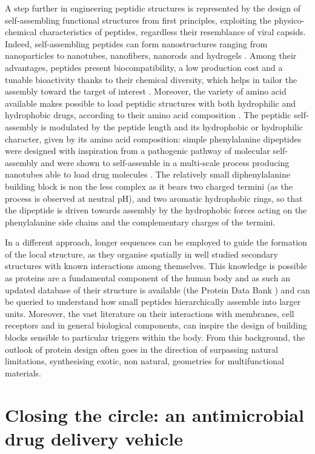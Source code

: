 A step further in engineering peptidic structures is represented by the design of self-assembling functional structures from first principles, exploiting the physico-chemical characteristics of peptides, regardless their resemblance of viral capsids.
%
Indeed, self-assembling peptides can form nanostructures ranging from nanoparticles to nanotubes, nanofibers, nanorods and hydrogels \cite{Fan2017}.
%
Among their advantages, peptides present biocompatibility, a low production cost and a tunable bioactivity thanks to their chemical diversity, which helps in tailor the assembly toward the target of interest \cite{Fan2017}. Moreover, the variety of amino acid available makes possible to load peptidic structures with both hydrophilic and hydrophobic drugs, according to their amino acid composition \cite{Ma2012}.
%
The peptidic self-assembly is modulated by the peptide length and its hydrophobic or hydrophilic character, given by its amino acid composition: simple phenylalanine dipeptides were designed with inspiration from a pathogenic pathway of molecular self-assembly and were shown to self-assemble in a multi-scale process producing nanotubes able to load drug molecules \cite{Silva2013}. The relatively small diphenylalanine building block is non the less complex as it bears two charged termini (as the process is observed at neutral pH), and two aromatic hydrophobic rings, so that the dipeptide is driven towards assembly by the hydrophobic forces acting on the phenylalanine side chains and the complementary charges of the termini.

In a different approach, longer sequences can be employed to guide the formation of the local structure, as they organise spatially in well studied secondary structures with known interactions among themselves.
%
This knowledge is possible as proteins are a fundamental component of the human body and as such an updated database of their structure is available (the Protein Data Bank \cite{PDB}) and can be queried to understand how small peptides hierarchically assemble into larger units.
%
Moreover, the vast literature on their interactions with membranes, cell receptors and in general biological components, can inspire the design of building blocks sensible to particular triggers within the body. From this background, the outlook of protein design often goes in the direction of surpassing natural limitations, synthesising exotic, non natural, geometries \cite{Yeates2019,Malay2019} for multifunctional materials.


\section{Closing the circle: an antimicrobial drug delivery vehicle}

